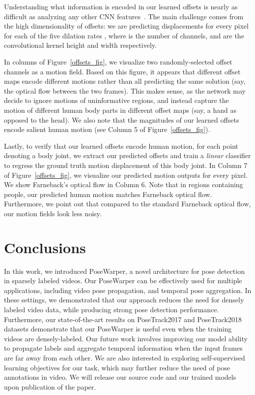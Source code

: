 \documentclass{article}
\begin{document}
Understanding what information is encoded in our learned offsets is nearly as difficult as analyzing any other CNN features~\cite{journals/corr/ZeilerF13, journals/corr/YosinskiCNFL15}. The main challenge comes from the high dimensionality of offsets: we are predicting    displacements for every pixel for each of the five dilation rates , where  is the number of channels, and  are the convolutional kernel height and width respectively. 




In columns  of Figure~\ref{offsets_fig}, we visualize two randomly-selected offset channels as a motion field. Based on this figure, it appears that different offset maps encode different motions rather than all predicting the same solution (say, the optical flow between the two frames). This makes sense, as the network may decide to ignore motions of uninformative regions, and instead capture the motion of different human body parts in different offset maps (say, a hand as opposed to the head). We also note that the magnitudes of our learned offsets encode salient human motion (see Column 5 of Figure~\ref{offsets_fig}). 



Lastly, to verify that our learned offsets encode human motion, for each point  denoting a body joint, we extract our predicted offsets and train a {\em linear} classifier to regress the ground truth  motion displacement of this body joint. In Column 7 of Figure~\ref{offsets_fig}, we visualize our predicted motion outputs for every pixel. We show Farneback's optical flow in Column 6. Note that in regions containing people, our predicted human motion matches Farneback optical flow. Furthermore, we point out that compared to the standard Farneback optical flow, our motion fields look less noisy.






\section{Conclusions}

In this work, we introduced PoseWarper, a novel architecture for pose detection in sparsely labeled videos. Our PoseWarper can be effectively used for multiple applications, including video pose propagation, and temporal pose aggregation. In these settings, we demonstrated that our approach reduces the need for densely labeled video data, while producing strong pose detection performance. Furthermore, our state-of-the-art results on PoseTrack2017 and PoseTrack2018 datasets demonstrate that our PoseWarper is useful even when the training videos are densely-labeled. Our future work involves improving our model ability to propagate labels and aggregate temporal information when the input frames are far away from each other. We are also interested in exploring self-supervised learning objectives for our task, which may further reduce the need of pose annotations in video. We will release our source code and our trained models upon publication of the paper.
\end{document}

